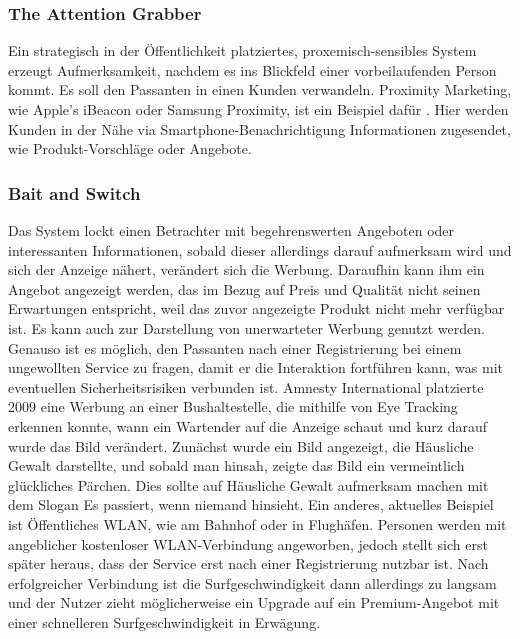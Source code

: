 \documentclass[a4paper]{article}
\begin{document}
\subsubsection{The Attention Grabber}
Ein strategisch in der Öffentlichkeit platziertes, proxemisch-sensibles System erzeugt Aufmerksamkeit, nachdem es ins Blickfeld einer vorbeilaufenden Person kommt. Es soll den Passanten in einen Kunden verwandeln.\newline
Proximity Marketing, wie Apple's iBeacon oder Samsung Proximity, ist ein Beispiel dafür \cite{proximity_marketing} \cite{proximity_marketing2}. Hier werden Kunden in der Nähe via Smartphone-Benachrichtigung Informationen zugesendet, wie Produkt-Vorschläge oder Angebote.

\subsubsection{Bait and Switch}
Das System lockt einen Betrachter mit begehrenswerten Angeboten oder interessanten Informationen, sobald dieser allerdings darauf aufmerksam wird und sich der Anzeige nähert, verändert sich die Werbung. Daraufhin kann ihm ein Angebot angezeigt werden, das im Bezug auf Preis und Qualität nicht seinen Erwartungen entspricht, weil das zuvor angezeigte Produkt nicht mehr verfügbar ist. Es kann auch zur Darstellung von unerwarteter Werbung genutzt werden. Genauso ist es möglich, den Passanten nach einer Registrierung bei einem ungewollten Service zu fragen, damit er die Interaktion fortführen kann, was mit eventuellen Sicherheitsrisiken verbunden ist.\newline
Amnesty International platzierte 2009 eine Werbung an einer Bushaltestelle, die mithilfe von Eye Tracking erkennen konnte, wann ein Wartender auf die Anzeige schaut und kurz darauf wurde das Bild verändert. Zunächst wurde ein Bild angezeigt, die Häusliche Gewalt darstellte, und sobald man hinsah, zeigte das Bild ein vermeintlich glückliches Pärchen. Dies sollte auf Häusliche Gewalt aufmerksam machen mit dem Slogan \glqq Es passiert, wenn niemand hinsieht.\grqq{} \cite{amnesty_international}
Ein anderes, aktuelles Beispiel ist Öffentliches WLAN, wie am Bahnhof oder in Flughäfen. Personen werden mit angeblicher kostenloser WLAN-Verbindung angeworben, jedoch stellt sich erst später heraus, dass der Service erst nach einer Registrierung nutzbar ist. Nach erfolgreicher Verbindung ist die Surfgeschwindigkeit dann allerdings zu langsam und der Nutzer zieht möglicherweise ein Upgrade auf ein Premium-Angebot mit einer schnelleren Surfgeschwindigkeit in Erwägung.
\end{document}
